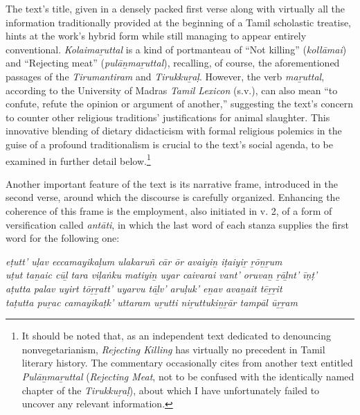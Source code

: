 The text’s title, given in a densely packed first verse along with virtually all the information traditionally provided at the beginning of a Tamil scholastic treatise, hints at the work’s hybrid form while still managing to appear entirely conventional. \emph{{Kolaimaṟuttal}} is a kind of portmanteau of “Not killing” (\emph{kollāmai}) and “Rejecting meat” (\emph{pulāṉmaṟuttal}), recalling, of course, the aforementioned passages of the \emph{{Tirumantiram}} and \emph{{Tirukkuṟaḷ}}. However, the verb \emph{maṟuttal}, according to the University of Madras \emph{Tamil Lexicon} (s.v.), can also mean “to confute, refute the opinion or argument of another,” suggesting the text’s concern to counter other religious traditions’ justifications for animal slaughter. This innovative blending of dietary didacticism with formal religious polemics in the guise of a profound traditionalism is crucial to the text’s social agenda, to be examined in further detail below.\footnote{%
It should be noted that, as an independent text dedicated to denouncing nonvegetarianism, \emph{Rejecting Killing} has virtually no precedent in Tamil literary history. The commentary occasionally cites from another text entitled \emph{{Pulāṉmaṟuttal}} (\emph{Rejecting Meat}, not to be confused with the identically named chapter of the \emph{{Tirukkuṟaḷ}}), about which I have unfortunately failed to uncover any relevant information.
}



Another important feature of the text is its narrative frame, introduced in the second verse, around which the discourse is carefully organized. Enhancing the coherence of this frame is the employment, also initiated in v. 2, of a form of versification called \emph{antāti}, in which the last word of each stanza supplies the first word for the following one:

\begin{pullquote}\raggedright
      \emph{eṭutt’ uḷav eccamayikaḷum ulakaruñ cār ōr avaiyiṉ iṭaiyiṟ ṟōṉṟum}\\
\emph{uṭut taṉaic cūḻ tara viḷaṅku matiyiṉ uyar caivarai vant’ oruvaṉ ṟāḻnt’ īṇṭ’}\\

\clearpage
\emph{aṭutta palav uyirt tōṟṟatt’ uyarvu tāḻv’ aruḷuk’ eṉav avaṉait tēṟṟit}\\
\emph{taṭutta puṟac camayikaṭk’ uttaram uṟutti niṟuttukiṉṟār tampāl ūṟṟam}
\end{pullquote}
      
